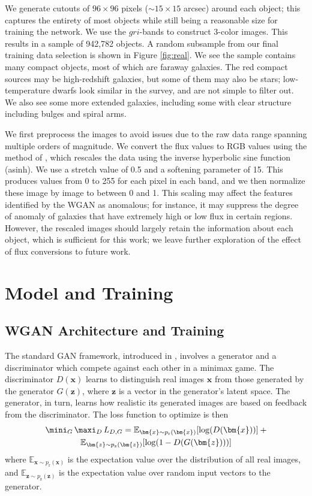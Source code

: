 We generate cutouts of $96 \times 96$ pixels ($\sim15\times 15$ arcsec) around each object; this captures the entirety of most objects while still being a reasonable size for training the network.
We use the $gri$-bands to construct 3-color images.
This results in a sample of 942,782 objects.
A random subsample from our final training data selection is shown in Figure \ref{fig:real}.
We see the sample contains many compact objects, most of which are faraway galaxies.
The red compact sources may be high-redshift galaxies, but some of them may also be stars; low-temperature dwarfs look similar in the survey, and are not simple to filter out.
We also see some more extended galaxies, including some with clear structure including bulges and spiral arms. 

We first preprocess the images to avoid issues due to the raw data range spanning multiple orders of magnitude.
We convert the flux values to RGB values using the method of \citealt{Lupton2004}, which rescales the data using the inverse hyperbolic sine function (asinh).
We use a stretch value of 0.5 and a softening parameter of 15.
This produces values from 0 to 255 for each pixel in each band, and we then normalize these image by image to between 0 and 1.
This scaling may affect the features identified by the WGAN as anomalous; for instance, it may suppress the degree of anomaly of galaxies that have extremely high or low flux in certain regions.
However, the rescaled images should largely retain the information about each object, which is sufficient for this work; we leave further exploration of the effect of flux conversions to future work.

\section{Model and Training}
\label{sec:model}

\subsection{WGAN Architecture and Training}

The standard GAN framework, introduced in \cite{Goodfellow2014}, involves a generator and a discriminator which compete against each other in a minimax game.
The discriminator $D(\bm{x})$ learns to distinguish real images $\bm{x}$ from those generated by the generator $G(\bm{z})$, where $\bm{z}$ is a vector in the generator's latent space.
The generator, in turn, learns how realistic its generated images are based on feedback from the discriminator.
The loss function to optimize is then
\begin{multline}
\mini_G \, \maxi_D \, L_{D,G} = \mathbb{E}_{\bm{x}\sim p_{\mathrm{r}}(\bm{x})}[\mathrm{log} (D(\bm{x}))] \: + \\ \mathbb{E}_{\bm{z}\sim p_{\mathrm{z}}(\bm{z})}[\mathrm{log}(1 - D(G(\bm{z})))] 
\end{multline}
where $\mathbb{E}_{\bm{x}\sim p_{\mathrm{r}}(\bm{x})}$ is the expectation value over the distribution of all real images, and $\mathbb{E}_{\bm{z}\sim p_{\mathrm{z}}(\bm{z})}$ is the expectation value over random input vectors to the generator.

